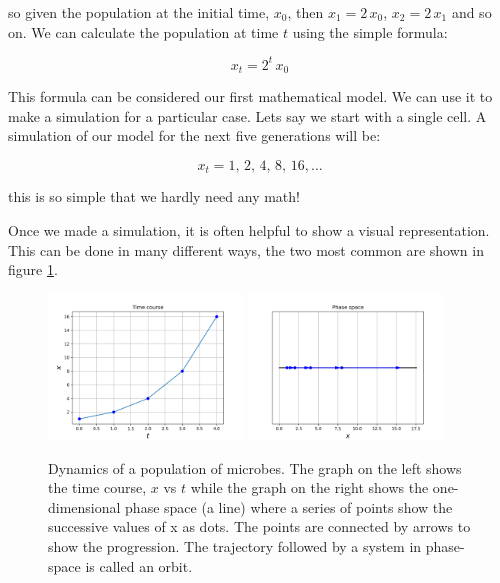 \documentclass{tufte-book} %
\begin{document}
so given the population at the initial time,  $x_0$, then $x_1=2\, x_0$, $x_2=2\, x_1$ and so on. We can calculate the population at time $t$ using the simple formula:

\begin{equation}
	x_{t} = 2^t \, x_0
\end{equation}

This formula can be considered our first mathematical model. We can use it to make a simulation for a particular case. Lets say we start with a single cell. A simulation of our model for the next five generations will be:

\begin{equation}
	x_{t} =1 ,\, 2 ,\,4 ,\,8 ,\,16,\dots
\end{equation}

this is so simple that we hardly need any math!

Once we made a simulation, it is often helpful to show a visual representation. This can be done in many different ways, the two most common are shown in figure \ref{fig:tcourse}. 


\begin{figure}
	\begin{center}
		\includegraphics[width=0.46\textwidth]{time_course}
		\includegraphics[width=0.46\textwidth]{phase_space}
	\end{center}
	\caption{Dynamics of a population of microbes. The graph on the left shows the time course, $x$ vs $t$ while the graph on the right shows the one-dimensional phase space (a line) where a series of points show the successive values of x as dots. The points are connected by arrows to show the progression. The trajectory followed by a system in phase-space is called an orbit.}
	\label{fig:tcourse}
\end{figure}
\end{document}
